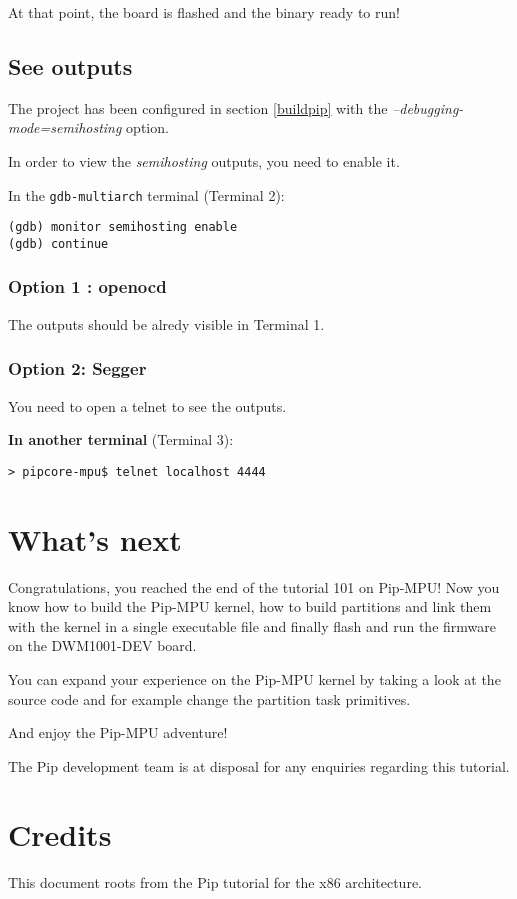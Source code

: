 \documentclass[10pt,a4paper,titlepage]{refart}
\begin{document}
At that point, the board is flashed and the binary ready to run!

\subsection{See outputs}
The project has been configured in section \ref{buildpip} with the \textit{--debugging-mode=semihosting} option.

In order to view the \textit{semihosting} outputs, you need to enable it.

In the \texttt{gdb-multiarch} terminal (Terminal 2):
\begin{lstlisting}[style=BashStyle]
(gdb) monitor semihosting enable
(gdb) continue
\end{lstlisting}

\subsubsection{Option 1 : openocd}
The outputs should be alredy visible in Terminal 1.

\subsubsection{Option 2: Segger}
You need to open a telnet to see the outputs.

\textbf{In another terminal} (Terminal 3):
\begin{lstlisting}[style=BashStyle]
> pipcore-mpu$ telnet localhost 4444
\end{lstlisting}

\section{What's next}
Congratulations, you reached the end of the tutorial 101 on Pip-MPU!
Now you know how to build the Pip-MPU kernel, how to build partitions and link them with the kernel in a single executable file and finally flash and run the firmware on the DWM1001-DEV board.

You can expand your experience on the Pip-MPU kernel by taking a look at the source code and for example change the partition task primitives.

And enjoy the Pip-MPU adventure!



The Pip development team is at disposal for any enquiries regarding this tutorial.


\section{Credits}
This document roots from the Pip tutorial for the x86 architecture.
\end{document}
